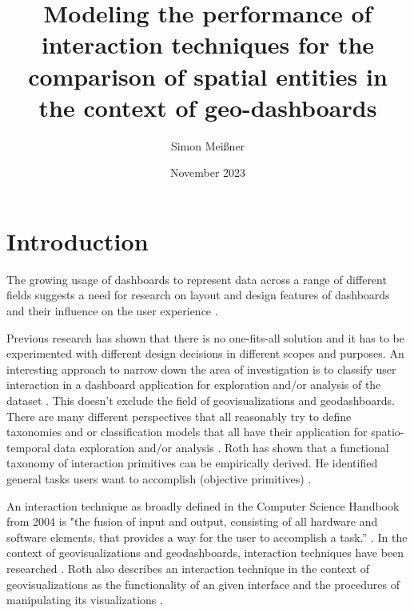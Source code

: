 \documentclass[12pt, twoside]{article}
\title{Modeling the performance of  interaction techniques for the comparison of spatial entities in the context of geo-dashboards}
\author{Simon Meißner}
\date{November 2023}
\begin{document}
\maketitle
\newpage
\begin{abstract}
\end{abstract}
\newpage
\tableofcontents



\newpage

\section{Introduction}
The growing usage of dashboards to represent data across a range of different 
fields suggests a need for research on layout and design features of dashboards 
and their influence on the user experience \citep*{Yigitbasioglu.2012,Sarikaya.2018}.

Previous research has shown that there is no one-fits-all solution and it has to be
experimented with different design decisions in different scopes and purposes.
An interesting approach to narrow down the area of investigation is to classify 
user interaction in a dashboard application for exploration and/or analysis of the
dataset \citep{Wehrend.1990}. This doesn't exclude the field of geovisualizations and
geodashboards. There are many different perspectives that all reasonably try to define
taxonomies and or classification models that all have their application for
spatio-temporal data exploration and/or analysis \citep*{Andrienko.2003,Crampton.2002}.
Roth has shown that a functional taxonomy of interaction primitives can be
empirically derived. He identified general tasks users want to accomplish (objective
primitives) \citep{Roth.2013}.

An interaction technique as broadly defined in the Computer Science Handbook from 2004
is "the fusion of input and output, consisting of all hardware and software elements, 
that provides  a way for the user to accomplish a task.” \citep*{Hinckley.2004}. In the
context of geovisualizations and geodashboards, interaction techniques have been
researched \citep*{Keim.2005,Lobo.2015,Roth.2013,vanTonder.2011}.
Roth also describes an interaction technique in the context of geovisualizations as the
functionality of an given interface and the procedures of manipulating its
visualizations \citep{Roth.2013}.
\end{document}
